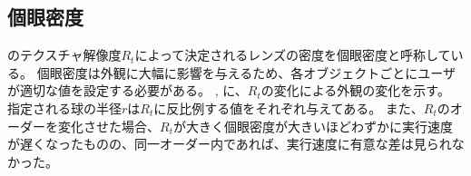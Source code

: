 \newpage
\subsection{個眼密度}
\label{SSTexReso}

のテクスチャ解像度$R_t$によって決定されるレンズの密度を個眼密度と呼称している。
個眼密度は外観に大幅に影響を与えるため、各オブジェクトごとにユーザが適切な値を設定する必要がある。
, に、$R_t$の変化による外観の変化を示す。
指定される球の半径$r$は$R_t$に反比例する値をそれぞれ与えてある。
また、$R_t$のオーダーを変化させた場合、$R_t$が大きく個眼密度が大きいほどわずかに実行速度が遅くなったものの、同一オーダー内であれば、実行速度に有意な差は見られなかった。

\begin{figure}[htbp]
  \centering
{}
\\
\end{figure}
